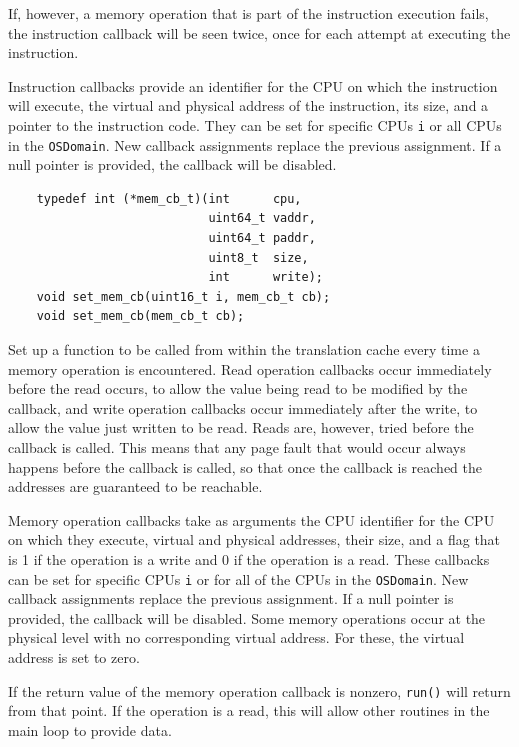 \documentclass[letterpaper, 10pt]{book}
\begin{document}
If, however, a memory operation that is part of the instruction execution
fails, the instruction callback will be seen twice, once for each attempt at
executing the instruction.

Instruction callbacks provide an identifier for the CPU on which the
instruction will execute, the virtual and physical address of the instruction,
its size, and a pointer to the instruction code. They can be set for specific
CPUs \texttt{i} or all CPUs in the \texttt{OSDomain}. New callback assignments
replace the previous assignment. If a null pointer is provided, the callback 
will be disabled.

\label{func:set_mem_cb} \begin{verbatim}
    typedef int (*mem_cb_t)(int      cpu,
                            uint64_t vaddr,
                            uint64_t paddr, 
                            uint8_t  size, 
                            int      write);
    void set_mem_cb(uint16_t i, mem_cb_t cb);
    void set_mem_cb(mem_cb_t cb);
\end{verbatim}
Set up a function to be called from within the translation cache every time a
memory operation is encountered. Read operation callbacks occur immediately
before the read occurs, to allow the value being read to be modified by the
callback, and write operation callbacks occur immediately after the write,
to allow the value just written to be read. Reads are, however, tried before
the callback is called. This means that any page fault that would occur always
happens before the callback is called, so that once the callback is reached
the addresses are guaranteed to be reachable.

Memory operation callbacks take as arguments the CPU identifier for the CPU
on which they execute, virtual and physical addresses, their size, and a flag
that is 1 if the operation is a write and 0 if the operation is a read. These
callbacks can be set for specific CPUs \texttt{i} or for all of the CPUs in the
\texttt{OSDomain}. New callback assignments replace the previous assignment. If
a null pointer is provided, the callback will be disabled. Some memory
operations occur at the physical level with no corresponding virtual address.
For these, the virtual address is set to zero.

If the return value of the memory operation callback is nonzero, \texttt{run()}
will return from that point. If the operation is a read, this will allow other
routines in the main loop to provide data.
\end{document}
